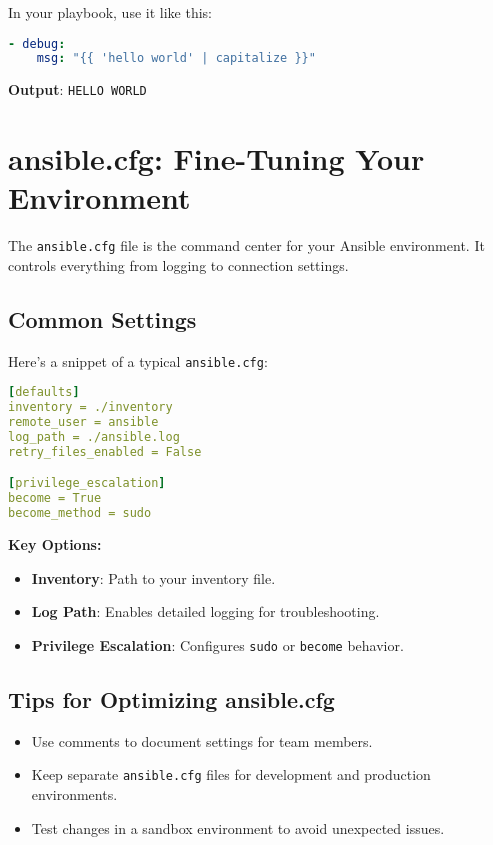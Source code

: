 In your playbook, use it like this:
\begin{lstlisting}[language=yaml, caption=Using a Custom Filter]
- debug:
    msg: "{{ 'hello world' | capitalize }}"
\end{lstlisting}

\textbf{Output}:
\texttt{HELLO WORLD}


\section{ansible.cfg: Fine-Tuning Your Environment}

The \texttt{ansible.cfg} file is the command center for your Ansible environment. It controls everything from logging to connection settings.

\subsection{Common Settings}

Here's a snippet of a typical \texttt{ansible.cfg}:
\begin{lstlisting}[language=yaml, caption=Sample ansible.cfg File]
[defaults]
inventory = ./inventory
remote_user = ansible
log_path = ./ansible.log
retry_files_enabled = False

[privilege_escalation]
become = True
become_method = sudo
\end{lstlisting}

\textbf{Key Options:}
\begin{itemize}
    \item \textbf{Inventory}: Path to your inventory file.
    \item \textbf{Log Path}: Enables detailed logging for troubleshooting.
    \item \textbf{Privilege Escalation}: Configures \texttt{sudo} or \texttt{become} behavior.
\end{itemize}

\subsection{Tips for Optimizing ansible.cfg}

\begin{itemize}
    \item Use comments to document settings for team members.
    \item Keep separate \texttt{ansible.cfg} files for development and production environments.
    \item Test changes in a sandbox environment to avoid unexpected issues.
\end{itemize}



